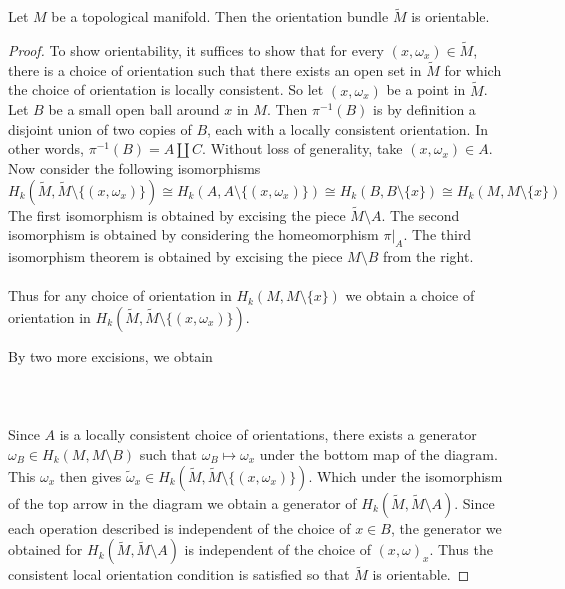 \documentclass[a4paper]{article}
\begin{document}
\begin{lmm}{}{} Let $M$ be a topological manifold. Then the orientation bundle $\widetilde{M}$ is orientable. \tcbline
\begin{proof}
To show orientability, it suffices to show that for every $(x,\omega_x)\in\tilde{M}$, there is a choice of orientation such that there exists an open set in $\tilde{M}$ for which the choice of orientation is locally consistent. So let $(x,\omega_x)$ be a point in $\tilde{M}$. Let $B$ be a small open ball around $x$ in $M$. Then $\pi^{-1}(B)$ is by definition a disjoint union of two copies of $B$, each with a locally consistent orientation. In other words, $\pi^{-1}(B)=A\amalg C$. Without loss of generality, take $(x,\omega_x)\in A$. Now consider the following isomorphisms $$H_k(\widetilde{M},\widetilde{M}\setminus\{(x,\omega_x)\})\cong H_k(A,A\setminus\{(x,\omega_x)\})\cong H_k(B,B\setminus\{x\})\cong H_k(M,M\setminus\{x\})$$ The first isomorphism is obtained by excising the piece $\widetilde{M}\setminus A$. The second isomorphism is obtained by considering the homeomorphism $\pi|_A$. The third isomorphism theorem is obtained by excising the piece $M\setminus B$ from the right. \\~\\

Thus for any choice of orientation in $H_k(M,M\setminus\{x\})$ we obtain a choice of orientation in $H_k(\widetilde{M},\widetilde{M}\setminus\{(x,\omega_x)\})$. 

By two more excisions, we obtain \\~\\
\\~\\

Since $A$ is a locally consistent choice of orientations, there exists a generator $\omega_B\in H_k(M,M\setminus B)$ such that $\omega_B\mapsto\omega_x$ under the bottom map of the diagram. This $\omega_x$ then gives $\widetilde{\omega}_x\in H_k(\widetilde{M},\widetilde{M}\setminus\{(x,\omega_x)\})$. Which under the isomorphism of the top arrow in the diagram we obtain a generator of $H_k(\widetilde{M},\widetilde{M}\setminus A)$. Since each operation described is independent of the choice of $x\in B$, the generator we obtained for $H_k(\widetilde{M},\widetilde{M}\setminus A)$ is independent of the choice of $(x,\omega)_x$. Thus the consistent local orientation condition is satisfied so that $\widetilde{M}$ is orientable. 
\end{proof}
\end{lmm}
\end{document}
